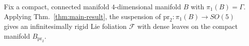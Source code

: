 \documentclass[11pt, letterpaper, oneside,reqno]{amsart}
\theoremstyle{plain}
\theoremstyle{underline}
\theoremstyle{definition}
\theoremstyle{remark}
\begin{document}
	
	Fix a compact, connected manifold $4$-dimensional manifold $B$ with $\pi_1(B)=\Gamma$. Applying Thm.~\ref{thm:main-result}, the suspension of $\text{pr}_{2}:\pi_1(B)\rightarrow SO(5)$ gives an infinitesimally rigid Lie foliation $\mathcal{F}$ with dense leaves on the compact manifold $B_{\text{pr}_{2}}$.
	
\end{document}
